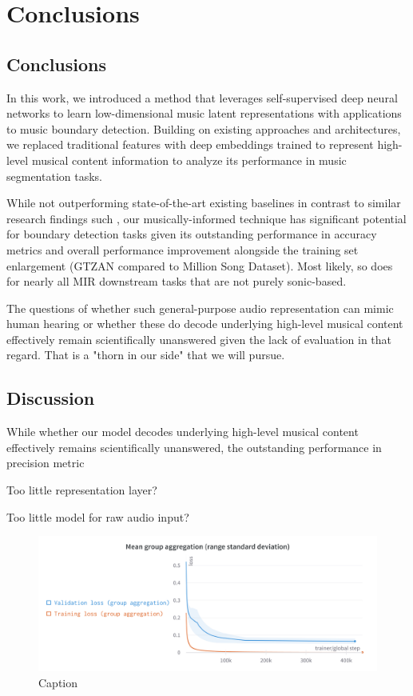 \chapter{Conclusions}

\section{Conclusions}

In this work, we introduced a method that leverages self-supervised deep neural networks to learn low-dimensional music latent representations with applications to music boundary detection. Building on existing approaches and architectures, we replaced traditional features with deep embeddings trained to represent high-level musical content information to analyze its performance in music segmentation tasks.

While not outperforming state-of-the-art existing baselines in contrast to similar research findings such \cite{deepfeaturesegment, SalamonDeepSegmentation}, our musically-informed technique has significant potential for boundary detection tasks given its outstanding performance in accuracy metrics and overall performance improvement alongside the training set enlargement (GTZAN compared to Million Song Dataset). Most likely, so does for nearly all MIR downstream tasks that are not purely sonic-based.

The questions of whether such general-purpose audio representation can mimic human hearing \cite{Li2023MERT:Training, Turian2022HEAR:Representations} or whether these do decode underlying high-level musical content effectively remain scientifically unanswered given the lack of evaluation in that regard. That is a "thorn in our side" that we will pursue.

\section{Discussion}

While whether our model decodes underlying high-level musical content effectively remains scientifically unanswered, the outstanding performance in precision metric

Too little representation layer?

Too little model for raw audio input? \cite{verydeep}

\begin{figure}
    \centering
    \includegraphics[width=\textwidth]{figures/images/Mean group aggregation.png}
    \caption{Caption}
    \label{fig:enter-label}
\end{figure}



\newpage



